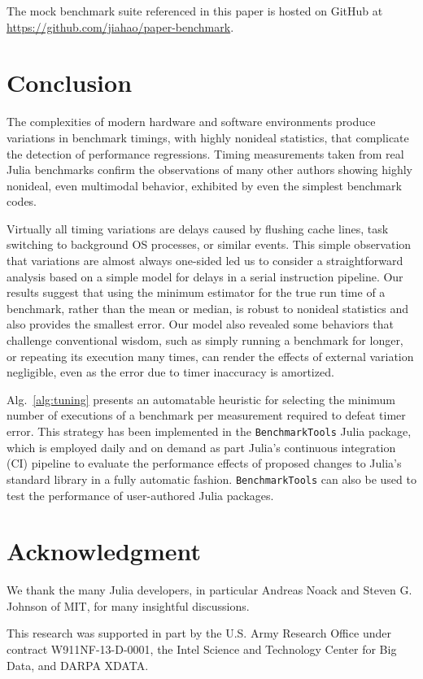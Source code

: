 \documentclass[conference]{IEEEtran}
\begin{document}
The mock benchmark suite referenced in this paper is hosted on GitHub at
\url{https://github.com/jiahao/paper-benchmark}.

\section{Conclusion}
\label{sec:conclusion}

The complexities of modern hardware and software environments produce
variations in benchmark timings, with highly nonideal statistics, that
complicate the detection of performance regressions. Timing measurements taken
from real Julia benchmarks confirm the observations of many other authors
showing highly nonideal, even multimodal behavior, exhibited by even the
simplest benchmark codes.

Virtually all timing variations are delays caused by flushing cache lines, task
switching to background OS processes, or similar events. This simple
observation that variations are almost always one-sided led us to consider a
straightforward analysis based on a simple model for delays in a serial
instruction pipeline. Our results suggest that using the minimum estimator for
the true run time of a benchmark, rather than the mean or median, is robust to
nonideal statistics and also provides the smallest error.  Our model also
revealed some behaviors that challenge conventional wisdom, such as simply
running a benchmark for longer, or repeating its execution many times, can
render the effects of external variation negligible, even as the error due to
timer inaccuracy is amortized.

Alg.~\ref{alg:tuning} presents an automatable heuristic for selecting the
minimum number of executions of a benchmark per measurement required to defeat
timer error. This strategy has been implemented in the
\lstinline|BenchmarkTools| Julia package, which is employed daily and on demand
as part Julia's continuous integration (CI) pipeline to evaluate the
performance effects of proposed changes to Julia's standard library in a fully
automatic fashion. \lstinline|BenchmarkTools| can also be used to test the
performance of user-authored Julia packages.


\section*{Acknowledgment}
\label{sec:acknowledgement}

We thank the many Julia developers, in particular Andreas Noack and Steven G.
Johnson of MIT, for many insightful discussions.

This research was supported in part by the U.S. Army Research Office under
contract W911NF-13-D-0001, the Intel Science and Technology Center for Big
Data, and DARPA XDATA.




\end{document}
